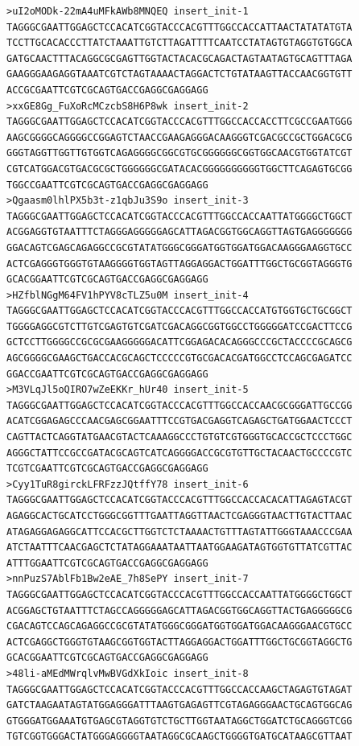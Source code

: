 \documentclass[11pt]{article}
\begin{document}
\begin{verbatim}
>uI2oMODk-22mA4uMFkAWb8MNQEQ insert_init-1
TAGGGCGAATTGGAGCTCCACATCGGTACCCACGTTTGGCCACCATTAACTATATATGTA
TCCTTGCACACCCTTATCTAAATTGTCTTAGATTTTCAATCCTATAGTGTAGGTGTGGCA
GATGCAACTTTACAGGCGCGAGTTGGTACTACACGCAGACTAGTAATAGTGCAGTTTAGA
GAAGGGAAGAGGTAAATCGTCTAGTAAAACTAGGACTCTGTATAAGTTACCAACGGTGTT
ACCGCGAATTCGTCGCAGTGACCGAGGCGAGGAGG
>xxGE8Gg_FuXoRcMCzcbS8H6P8wk insert_init-2
TAGGGCGAATTGGAGCTCCACATCGGTACCCACGTTTGGCCACCACCTTCGCCGAATGGG
AAGCGGGGCAGGGGCCGGAGTCTAACCGAAGAGGGACAAGGGTCGACGCCGCTGGACGCG
GGGTAGGTTGGTTGTGGTCAGAGGGGCGGCGTGCGGGGGGCGGTGGCAACGTGGTATCGT
CGTCATGGACGTGACGCGCTGGGGGGCGATACACGGGGGGGGGGTGGCTTCAGAGTGCGG
TGGCCGAATTCGTCGCAGTGACCGAGGCGAGGAGG
>Qgaasm0lhlPX5b3t-z1qbJu3S9o insert_init-3
TAGGGCGAATTGGAGCTCCACATCGGTACCCACGTTTGGCCACCAATTATGGGGCTGGCT
ACGGAGGTGTAATTTCTAGGGAGGGGGAGCATTAGACGGTGGCAGGTTAGTGAGGGGGGG
GGACAGTCGAGCAGAGGCCGCGTATATGGGCGGGATGGTGGATGGACAAGGGAAGGTGCC
ACTCGAGGGTGGGTGTAAGGGGTGGTAGTTAGGAGGACTGGATTTGGCTGCGGTAGGGTG
GCACGGAATTCGTCGCAGTGACCGAGGCGAGGAGG
>HZfblNGgM64FV1hPYV8cTLZ5u0M insert_init-4
TAGGGCGAATTGGAGCTCCACATCGGTACCCACGTTTGGCCACCATGTGGTGCTGCGGCT
TGGGGAGGCGTCTTGTCGAGTGTCGATCGACAGGCGGTGGCCTGGGGGATCCGACTTCCG
GCTCCTTGGGGCCGCGCGAAGGGGGACATTCGGAGACACAGGGCCCGCTACCCCGCAGCG
AGCGGGGCGAAGCTGACCACGCAGCTCCCCCGTGCGACACGATGGCCTCCAGCGAGATCC
GGACCGAATTCGTCGCAGTGACCGAGGCGAGGAGG
>M3VLqJl5oQIRO7wZeEKKr_hUr40 insert_init-5
TAGGGCGAATTGGAGCTCCACATCGGTACCCACGTTTGGCCACCAACGCGGGATTGCCGG
ACATCGGAGAGCCCAACGAGCGGAATTTCCGTGACGAGGTCAGAGCTGATGGAACTCCCT
CAGTTACTCAGGTATGAACGTACTCAAAGGCCCTGTGTCGTGGGTGCACCGCTCCCTGGC
AGGGCTATTCCGCCGATACGCAGTCATCAGGGGACCGCGTGTTGCTACAACTGCCCCGTC
TCGTCGAATTCGTCGCAGTGACCGAGGCGAGGAGG
>Cyy1TuR8girckLFRFzzJQtffY78 insert_init-6
TAGGGCGAATTGGAGCTCCACATCGGTACCCACGTTTGGCCACCACACATTAGAGTACGT
AGAGGCACTGCATCCTGGGCGGTTTGAATTAGGTTAACTCGAGGGTAACTTGTACTTAAC
ATAGAGGAGAGGCATTCCACGCTTGGTCTCTAAAACTGTTTAGTATTGGGTAAACCCGAA
ATCTAATTTCAACGAGCTCTATAGGAAATAATTAATGGAAGATAGTGGTGTTATCGTTAC
ATTTGGAATTCGTCGCAGTGACCGAGGCGAGGAGG
>nnPuzS7AblFb1Bw2eAE_7h8SePY insert_init-7
TAGGGCGAATTGGAGCTCCACATCGGTACCCACGTTTGGCCACCAATTATGGGGCTGGCT
ACGGAGCTGTAATTTCTAGCCAGGGGGAGCATTAGACGGTGGCAGGTTACTGAGGGGGCG
CGACAGTCCAGCAGAGGCCGCGTATATGGGCGGGATGGTGGATGGACAAGGGAACGTGCC
ACTCGAGGCTGGGTGTAAGCGGTGGTACTTAGGAGGACTGGATTTGGCTGCGGTAGGCTG
GCACGGAATTCGTCGCAGTGACCGAGGCGAGGAGG
>48li-aMEdMWrqlvMwBVGdXkIoic insert_init-8
TAGGGCGAATTGGAGCTCCACATCGGTACCCACGTTTGGCCACCAAGCTAGAGTGTAGAT
GATCTAAGAATAGTATGGAGGGATTTAAGTGAGAGTTCGTAGAGGGAACTGCAGTGGCAG
GTGGGATGGAAATGTGAGCGTAGGTGTCTGCTTGGTAATAGGCTGGATCTGCAGGGTCGG
TGTCGGTGGGACTATGGGAGGGGTAATAGGCGCAAGCTGGGGTGATGCATAAGCGTTAAT

\end{verbatim}
\end{document}
